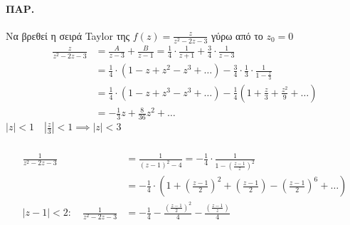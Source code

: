 \documentclass[12pt,a4paper,titlepage,fleqn]{article}
\begin{document}
  
  \paragraph{ΠΑΡ.}
  Να βρεθεί η σειρά Taylor της \( f(z) = \frac{z}{z^2-2z-3} \) γύρω από το \(z_0 = 0\)
  \begin{align*}
  \frac{z}{z^2-2z-3} &= \frac{A}{z-3}+\frac{B}{z-1} = \frac{1}{4}\cdot\frac{1}{z+1}
  + \frac{3}{4} \cdot \frac{1}{z-3} \\
  &= \frac{1}{4} \cdot (1-z+z^2-z^3+\dots) - \frac{3}{4}\cdot\frac{1}{3}\cdot
  \frac{1}{1-\frac{z}{3}} \\ &=
  \frac{1}{4}\cdot\left(1-z+z^3-z^3+\dots \right)
  -\frac{1}{4}\left( 1+\frac{z}{3} + \frac{z^2}{9}+\dots \right)
  \\ &= -\frac{1}{3}z+\frac{8}{36}z^2+\dots
  \end{align*}
  \( |z|<1 \quad \left|\frac{z}{3}\right|<1 \implies |z| < 3 \)
  
  \subparagraph{}
  \begin{align*}
  \frac{1}{z^2-2z-3} &= \frac{1}{(z-1)^2 - 4} = -\frac{1}{4}\cdot
  \frac{1}{1-\left(\frac{z-1}{z}\right)^2} \\ &=
  -\frac{1}{4}\cdot\left(
  1+\left(\frac{z-1}{2}\right)^2+\left(\frac{z-1}{2}\right)
  -\left(\frac{z-1}{2}\right)^6+\dots
  \right) \\ |z-1|<2 : \quad \frac{1}{z^2-2z-3}
  &= -\frac{1}{4} -\frac{\left(\frac{z-1}{2}\right)^2}{4} 
  - \frac{\left( \frac{z-1}{z} \right)}{4}
  \end{align*}
  
  \paragraph{}
  
\end{document}
